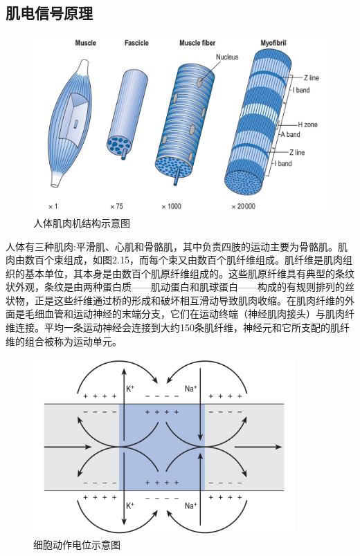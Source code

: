 \subsection{肌电信号原理}
\begin{figure}[htb]
    \includegraphics[width=14cm]{fig/f43.jpg}
    \caption{人体肌肉机结构示意图\cite{p44}}
    \label{fig:mark}
\end{figure}
人体有三种肌肉:平滑肌、心肌和骨骼肌，其中负责四肢的运动主要为骨骼肌。肌肉由数百个束组成，如图2.15，而每个束又由数百个肌纤维组成。肌纤维是肌肉组织的基本单位，其本身是由数百个肌原纤维组成的。这些肌原纤维具有典型的条纹状外观，条纹是由两种蛋白质——肌动蛋白和肌球蛋白——构成的有规则排列的丝状物，正是这些纤维通过桥的形成和破坏相互滑动导致肌肉收缩。在肌肉纤维的外面是毛细血管和运动神经的末端分支，它们在运动终端（神经肌肉接头）与肌肉纤维连接。平均一条运动神经会连接到大约150条肌纤维，神经元和它所支配的肌纤维的组合被称为运动单元。

\begin{figure}[htb]
    \includegraphics[width=10cm]{fig/f42.png}
    \caption{细胞动作电位示意图\cite{p44}}
    \label{fig:mark}
\end{figure}

